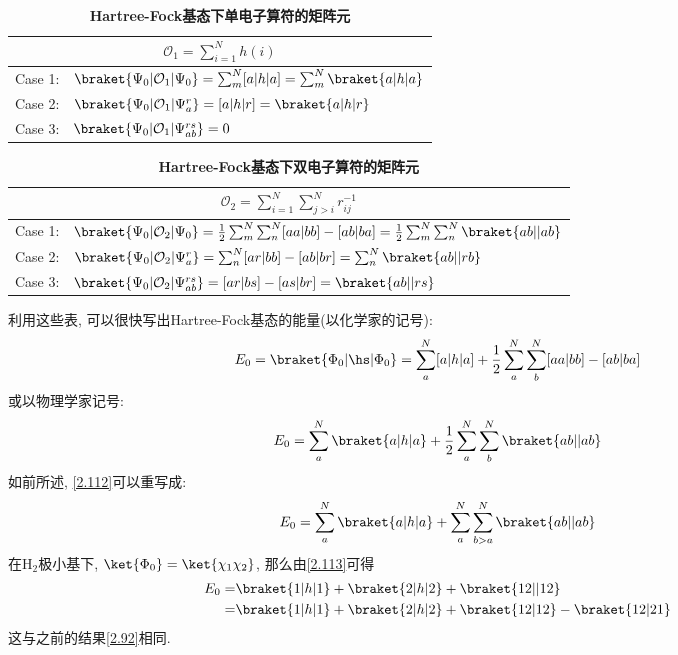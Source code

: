 \begin{table}[h]
	\renewcommand\arraystretch{1.7}
	\centering
	\caption{\bf Hartree-Fock基态下单电子算符的矩阵元}
	\label{t2.5}
	\begin{tabularx}{\textwidth}{lY}
		\hline
		\\\hline
		Case 1: & $\braket{\Psi_0|\mathcal{O}_1|\Psi_0} = \sum_m^N [a|h|a]=\sum_m^N\braket{a|h|a}$\\
		Case 2: & $\braket{\Psi_0|\mathcal{O}_1|\Psi_a^r} = [a|h|r]=\braket{a|h|r}$\\
		Case 3: & $\braket{\Psi_0|\mathcal{O}_1|\Psi_{ab}^{rs}} = 0$\\\hline
	\end{tabularx}
\end{table}

\begin{table}[h]
	\renewcommand\arraystretch{1.7}
	\centering
	\caption{\bf Hartree-Fock基态下双电子算符的矩阵元}
	\label{t2.6}
	\begin{tabularx}{\textwidth}{lY}
		\hline
		\\\hline
		Case 1: & $\braket{\Psi_0|\mathcal{O}_2|\Psi_0} = \frac{1}{2}\sum_m^N\sum_n^N [aa|bb]-[ab|ba]=\frac{1}{2}\sum_m^N\sum_n^N\braket{ab||ab}$\\
		Case 2: & $\braket{\Psi_0|\mathcal{O}_2|\Psi_a^r} = \sum_n^N[ar|bb]-[ab|br]=\sum_n^N\braket{ab||rb}$\\
		Case 3: & $\braket{\Psi_0|\mathcal{O}_2|\Psi_{ab}^{rs}} = [ar|bs]-[as|br]=\braket{ab||rs}$\\\hline
	\end{tabularx}
\end{table}

利用这些表, 
可以很快写出Hartree-Fock基态的能量(以化学家的记号):
\begin{equation}\label{eq:2.111}
E_0 = \braket{\Phi_0|\hs|\Phi_0} = \sum_{a}^{N}[a|h|a] + \frac{1}{2}\sum_{a}^{N}\sum_{b}^{N}[aa|bb]-[ab|ba]
\end{equation}  
或以物理学家记号:
\begin{equation}
\label{2.112}
E_0 = \sum_{a}^{N}\braket{a|h|a} + \frac{1}{2}\sum_{a}^{N}\sum_{b}^{N}\braket{ab||ab}
\end{equation}
如前所述, 
\autoref{2.112}可以重写成:
\begin{equation}
\label{2.113}
E_0 = \sum_{a}^{N}\braket{a|h|a} + \sum_{a}^{N}\sum_{b>a}^{N}\braket{ab||ab}
\end{equation}
在$\mathrm{H}_2$极小基下, 
$\ket{\Phi_0}=\ket{\chi_1\chi_2}$, 
那么由\autoref{2.113}可得
\begin{align}
E_0 =& \braket{1|h|1} + \braket{2|h|2} + \braket{12||12}\notag\\
    =& \braket{1|h|1} + \braket{2|h|2} + \braket{12|12} - \braket{12|21}
\end{align}
这与之前的结果\autoref{2.92}相同.


